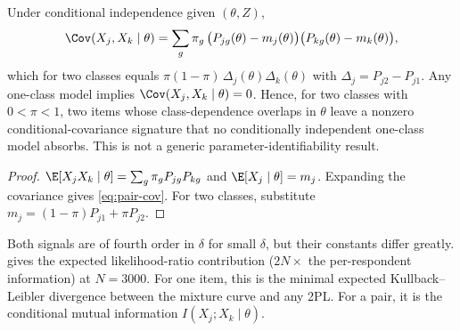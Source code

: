 \begin{proposition}\label{prop:pair}\proved{}
Under conditional independence given $(\theta,Z)$,
\begin{equation}\label{eq:pair-cov}
  \Cov(X_j,X_k\mid\theta)=\sum_g\pi_g\,\bigl(P_{jg}(\theta)-m_j(\theta)\bigr)\bigl(P_{kg}(\theta)-m_k(\theta)\bigr),
\end{equation}
which for two classes equals $\pi(1-\pi)\,\Delta_j(\theta)\Delta_k(\theta)$ with
$\Delta_j=P_{j2}-P_{j1}$. Any one-class model implies $\Cov(X_j,X_k\mid\theta)=0$. Hence, for two classes with $0<\pi<1$, two items whose class-dependence overlaps in
$\theta$ leave a nonzero conditional-covariance signature that no conditionally independent
one-class model absorbs. This is not a generic parameter-identifiability result.
\end{proposition}
\begin{proof}
$\E[X_jX_k\mid\theta]=\sum_g\pi_gP_{jg}P_{kg}$ and $\E[X_j\mid\theta]=m_j$. Expanding the
covariance gives \eqref{eq:pair-cov}. For two classes, substitute $m_j=(1-\pi)P_{j1}+\pi P_{j2}$.
\end{proof}

Both signals are of fourth order in $\delta$ for small $\delta$, but their constants differ
greatly.  gives the expected likelihood-ratio contribution
($2N\times$ the per-respondent information) at $N=3000$. For one item, this is the minimal
expected Kullback--Leibler divergence between the mixture curve and any 2PL. For a pair, it is
the conditional mutual information $I(X_j;X_k\mid\theta)$.

\begin{table}[t]
\centering\small
\caption{Expected likelihood-ratio contribution at $N=3000$ of one biased item (the part no 2PL
absorbs) and of one biased pair (conditional mutual information), for $a=1.25$, $b=0$,
$\pi=\tfrac12$ and exact $\theta$. For comparison, the BIC penalty per extra parameter is
$\ln 3000\approx8$. Source: \texttt{scripts/levelB\_information.py}.}
\label{tab:information}
\end{table}

